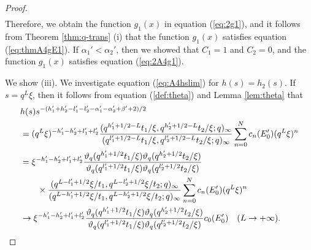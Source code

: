 \documentclass[12pt]{amsart}
\numberwithin{equation}{section}
\theoremstyle{definition}
\theoremstyle{remark}
\begin{document}
\begin{proof}
\begin{align}
  \end{align}
Therefore, we obtain the function $g_1 (x)$ in equation (\ref{eq:2g1}), and it follows from Theorem \ref{thm:q-trans} (i) that the function $g_1 (x)$ satisfies equation (\ref{eq:thmA4gE1}).
If $\alpha_{1}' < \alpha_{2}'$, then we showed that $C_1=1$ and $C_2=0$, and the function $g_1 (x)$ satisfies equation (\ref{eq:2A4g1}).

We show (iii).
We investigate equation (\ref{eq:A4hslim}) for $h(s)=h_2(s)$.
If $s= q^{L}\xi$, then it follows from equation (\ref{def:theta}) and Lemma \ref{lem:theta} that
\begin{align*}
  &h(s) s^{- (h_{1}' + h_{2}' - l_{1}' - l_{2}' - \alpha_{1}' - \alpha_{2}' + \beta' + 2)/2} \\
  &= (q^{L}\xi)^{-h_{1}' - h_{2}' + l_{1}' + l_{2}'} \frac{(q^{h_{1}' + 1/2 - L}t_{1}/\xi, q^{h_{2}' + 1/2 - L}t_{2}/\xi; q)_\infty}{(q^{l_{1}' + 1/2 - L}t_{1}/\xi, q^{l_{2}' + 1/2 - L}t_{2}/\xi; q)_\infty} \sum_{n = 0}^{N} c_{n} (E'_0) (q^{L}\xi)^{n} \notag \\
  &= \xi^{-h_{1}' - h_{2}' + l_{1}' + l_{2}'} \frac{\vartheta_{q}(q^{h_{1}' + 1/2 }t_{1}/\xi) \vartheta_{q} ( q^{h_{2}' + 1/2 }t_{2}/\xi )}{\vartheta_{q} (q^{l_{1}' + 1/2 }t_{1}/\xi) \vartheta_{q} (q^{l_{2}' + 1/2 }t_{2}/\xi ) } \notag \\
& \qquad \times \frac{(q^{L- l_{1}' + 1/2 } \xi / t_{1}, q^{L- l_{2}' + 1/2 } \xi / t_{2}; q)_\infty}{(q^{L- h_{1}' + 1/2 } \xi / t_{1}, q^{L- h_{2}' + 1/2 } \xi / t_{2}; q)_\infty} \sum_{n = 0}^{N} c_{n} (E'_0) (q^{L}\xi)^{n} \notag \\
  & \to \xi^{-h_{1}' - h_{2}' + l_{1}' + l_{2}'} \frac{\vartheta_{q}(q^{h_{1}' + 1/2 }t_{1}/\xi) \vartheta_{q} ( q^{h_{2}' + 1/2 }t_{2}/\xi )}{\vartheta_{q} (q^{l_{1}' + 1/2 }t_{1}/\xi) \vartheta_{q} (q^{l_{2}' + 1/2 }t_{2}/\xi ) } c_{0} (E'_0) \quad ( L \to +\infty ). \notag

\end{align*}
\end{proof}
\end{document}
